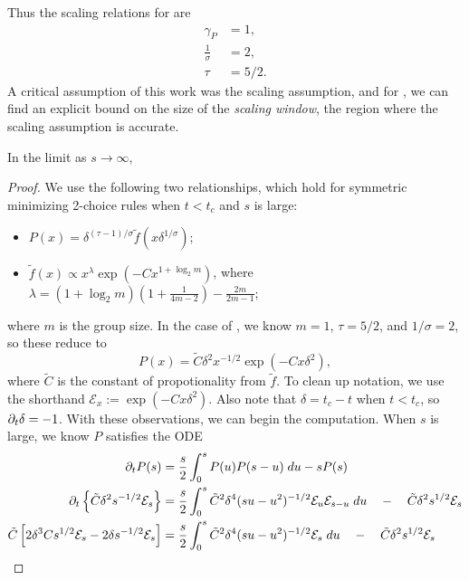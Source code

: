 \documentclass[twoside,10pt]{article}
\begin{document}
Thus the scaling relations for \ER are
\begin{align*}
        \gamma_{P} &= 1,\\
        \frac{1}{\sigma} &= 2,\\
        \tau &= 5/2.
\end{align*}
A critical assumption of this work was the scaling assumption, and for \ER, we can find an explicit bound on the size of the \textit{scaling window}, the region where the scaling assumption is accurate.

\begin{thrm}[]
        In the limit as $s\to \infty$, 
\end{thrm}
\begin{proof}
We use the following two relationships, which hold for symmetric minimizing 2-choice rules when $t < t_c$ and $s$ is large: 
\begin{itemize}
        \item $P(x) = \delta^{(\tau-1)/\sigma} \tilde{f}(x \delta^{1/\sigma})$;
        \item $\tilde{f}(x) \propto x^{\lambda} \exp\left( -Cx^{1 + \log_2 m} \right)$, where $\lambda = (1+\log_2 m)\left( 1 + \frac{1}{4m-2}  \right)-\frac{2m}{2m-1} $;
\end{itemize}
where $m$ is the group size. In the case of \ER, we know $m=1$, $\tau=5/2$, and $1/\sigma = 2$, so these reduce to
\[
        P(x) = \tilde{C} \delta^{2} x^{-1/2} \exp\left( -Cx \delta^{2} \right),
\]
where $ \tilde{C}$ is the constant of propotionality from $\tilde{f}$. To clean up notation, we use the shorthand $\mathcal{E}_x := \exp\left( -C x \delta^{2} \right)$. Also note that $\delta = t_c-t$ when $t < t_c$, so $\partial_{t}{\delta} =-1$. With these observations, we can begin the computation. When $s$ is large, we know $P$ satisfies the ODE 
\begin{align*}
        \p_{t}{P}(s) &= \frac{s}{2} \int_{0}^{s} P(u)P(s-u)\;du - sP(s) \\
        \p_{t}\left\{ \tilde{C} \delta^{2}s^{-1/2}\mathcal{E}_{s} \right\} &= \frac{s}{2} \int_{0}^{s} \tilde{C}^{2}\delta^{4}(su-u^2)^{-1/2} \mathcal{E}_{u}\mathcal{E}_{s-u} \; du \quad-\quad \tilde{C}\delta^{2}s^{1/2}\mathcal{E}_{s} \\
        \tilde{C} \left[ 2\delta^{3}Cs^{1/2} \mathcal{E}_s - 2\delta s^{-1/2} \mathcal{E}_{s} \right] &= \frac{s}{2} \int_{0}^{s} \tilde{C}^{2}\delta^{4}(su-u^2)^{-1/2} \mathcal{E}_{s} \; du \quad-\quad \tilde{C}\delta^{2}s^{1/2}\mathcal{E}_{s} \\

\end{align*}
\end{proof}
\end{document}
